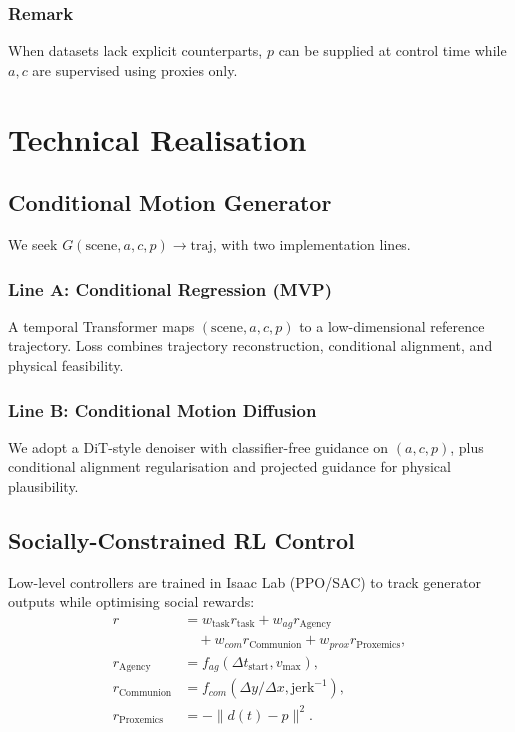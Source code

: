 \documentclass[journal]{IEEEtran}
\begin{document}
\subsubsection*{Remark}
When datasets lack explicit counterparts, $p$ can be supplied at control time while $a, c$ are supervised using proxies only.

\section{Technical Realisation}\label{sec:tech}

\subsection{Conditional Motion Generator}
We seek $G(\text{scene}, a, c, p) \to \text{traj}$, with two implementation lines.

\subsubsection{Line A: Conditional Regression (MVP)}
A temporal Transformer maps $(\text{scene}, a, c, p)$ to a low-dimensional reference trajectory. Loss combines trajectory reconstruction, conditional alignment, and physical feasibility.

\subsubsection{Line B: Conditional Motion Diffusion}
We adopt a DiT-style denoiser with classifier-free guidance on $(a, c, p)$, plus conditional alignment regularisation and projected guidance for physical plausibility.

\subsection{Socially-Constrained RL Control}
Low-level controllers are trained in Isaac Lab (PPO/SAC) to track generator outputs while optimising social rewards:
\begin{align}
r &= w_{\text{task}} r_{\text{task}}
   + w_{ag} r_{\text{Agency}} \nonumber \\
  &\quad + w_{com} r_{\text{Communion}}
   + w_{prox} r_{\text{Proxemics}}, \label{eq:reward} \\
r_{\text{Agency}} &= f_{ag}(\Delta t_{\text{start}}, v_{\max}),
   \label{eq:r-agency} \\
r_{\text{Communion}} &= f_{com}(\Delta y / \Delta x, \text{jerk}^{-1}),
   \label{eq:r-com} \\
r_{\text{Proxemics}} &= -\|d(t) - p\|^{2}. \label{eq:r-prox}
\end{align}
\end{document}
